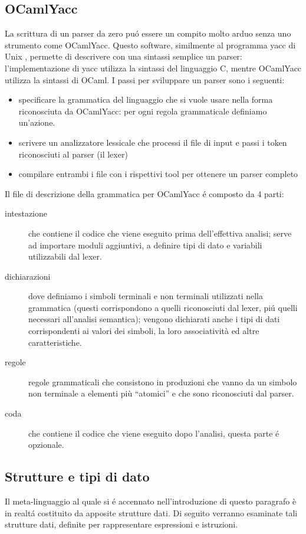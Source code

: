 \documentclass[a4paper,10pt]{article}
\begin{document}
\subsection{OCamlYacc}
La scrittura di un parser da zero pu\'o essere un compito molto arduo senza uno
strumento come OCamlYacc. Questo software, similmente al programma yacc di Unix
, permette di descrivere con una sintassi semplice un parser: l'implementazione
 di yacc utilizza la sintassi del linguaggio C, mentre OCamlYacc utilizza la
 sintassi di OCaml.
I passi per sviluppare un parser sono i seguenti:
\begin{itemize}
    \item specificare la grammatica del linguaggio che si vuole usare nella
forma riconosciuta da OCamlYacc: per ogni regola grammaticale definiamo 
un'azione.
    \item scrivere un analizzatore lessicale che processi il file di input e
passi i token riconosciuti al parser (il lexer)
    \item compilare entrambi i file con i rispettivi tool per ottenere un
parser completo
\end{itemize}
Il file di descrizione della grammatica per OCamlYacc \'e composto da 4 parti:
\begin{description}
\item[intestazione] che contiene il codice che viene eseguito prima 
dell'effettiva analisi; serve ad importare moduli aggiuntivi, a definire tipi
di dato e variabili utilizzabili dal lexer.

\item[dichiarazioni] dove definiamo i simboli terminali e non terminali
utilizzati nella grammatica (questi corrispondono a quelli riconosciuti dal
lexer, pi\'u quelli necessari all'analisi semantica); vengono dichiarati 
anche i tipi di dati corrispondenti ai valori dei simboli, 
la loro associativit\`a ed altre caratteristiche.

\item[regole] regole grammaticali che consistono in produzioni che vanno da un
simbolo non terminale a elementi pi\`u ``atomici'' e che sono riconosciuti dal
parser.

\item[coda] che contiene il codice che viene eseguito dopo l'analisi, questa
parte \'e opzionale.
\end{description}

\subsection{Strutture e tipi di dato}
Il meta-linguaggio al quale si \'e accennato nell'introduzione di questo 
paragrafo \`e in realt\'a costituito da apposite strutture dati. 
Di seguito verranno esaminate tali strutture dati, definite per 
rappresentare espressioni e istruzioni.
\end{document}
